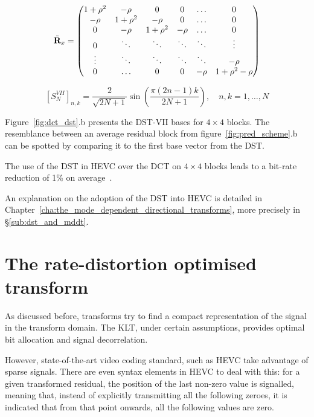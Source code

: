 \documentclass[11pt,a4paper,openright,twoside]{book}
\numberwithin{equation}{section} %
\numberwithin{figure}{section} %
\numberwithin{table}{section} %
\begin{document}
\begin{equation}
	\tilde{\mathbf{R}}_x =
	\begin{pmatrix}
		1+\rho^2 & -\rho    & 0        & 0      & \hdots & 0            \\
		-\rho    & 1+\rho^2 & -\rho    & 0      & \hdots & 0            \\
		0        & -\rho    & 1+\rho^2 & -\rho  & \hdots & 0            \\
		0        & \ddots   & \ddots   & \ddots & \ddots & \vdots       \\
		\vdots   & \ddots   & \ddots   & \ddots & \ddots & -\rho        \\
		0        & \hdots   & 0        & 0      & -\rho  & 1+\rho^2-\rho
	\end{pmatrix}
	\label{eqn:tridiagonal_matrix}
\end{equation}

\begin{equation}
	{\left[S_{N}^{VII} \right]}_{n,k} =
	\frac{2}{\sqrt{2N+1}}\sin\left(\frac{\pi(2n-1)k}{2N+1}\right),
	\quad
	n,k = 1, \dots, N
	\label{eqn:dst_vii}
\end{equation}

Figure~\ref{fig:dct_dst}.b presents the \ac{DST}-VII bases for
$4\times4$ blocks.
The resemblance between an average residual block from
figure~\ref{fig:pred_scheme}.b can be spotted by comparing it to the first
base vector from the \ac{DST}.

The use of the \ac{DST} in \ac{HEVC} over the \ac{DCT} on $4\times4$
blocks leads to a bit-rate reduction of 1\% on
average~\cite{sullivan-12-overview-hevc}.

An explanation on the adoption of the \ac{DST} into \ac{HEVC} is detailed in
Chapter~\ref{cha:the_mode_dependent_directional_transforms}, more precisely in
\S\ref{sub:dst_and_mddt}.

\section{The rate-distortion optimised transform}
\label{sec:the_rate_distortion_optimised_transform}

As discussed before, transforms try to find a compact representation of the
signal in the transform domain.
The \ac{KLT}, under certain assumptions, provides optimal bit allocation and
signal decorrelation.

However, state-of-the-art video coding standard, such as \ac{HEVC} take
advantage of sparse signals.
There are even syntax elements in \ac{HEVC} to deal with this:
for a given transformed residual, the position of the last non-zero value is
signalled, meaning that, instead of explicitly transmitting all the following
zeroes, it is indicated that from that point onwards, all the following values
are zero.
\end{document}
